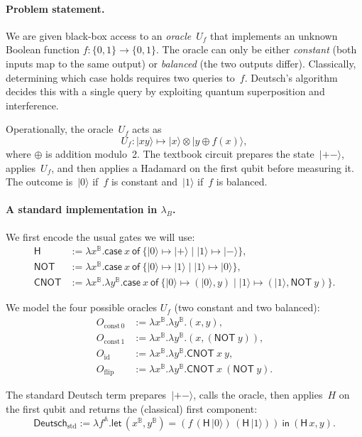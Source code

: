 \documentclass[runningheads,orivec,envcountsame,envcountsect]{llncs}
\newcommand\ket[1]{\ensuremath{|#1\rangle}}
\newcommand\AbsBasis{\ensuremath{\mathbb{A}}}
\def\Pair#1#2{(#1,#2)} %
\def\Lam#1#2#3{\lambda#1^{#2}{.}#3} %
\def\letkeyword{\mathsf{let}}
\def\inkeyword{\mathsf{in}}
\def\LetP#1#2#3#4#5#6{\letkeyword\,\Pair{#1^{#2}}{#3^{#4}}=#5~\inkeyword~#6}
\def\case#1#2#3#4#5{\ensuremath{\mathsf{case}~#1~\mathsf{of}~\{#2\mapsto #4 \mid #3\mapsto #5\}}}
\newcommand\B{\mathbb B}
\newcommand\Hd{\mathsf{H}}
\newcommand{\cnot}[2]{\mathsf{CNOT}\ #1\ #2}
\newcommand{\pauliX}[1]{\mathsf{NOT}\ #1}
\newcommand{\lambdaB}{\lambda_B}
\begin{document}
\paragraph{Problem statement.}
We are given black-box access to an \emph{oracle}~$U_f$ that implements an
unknown Boolean function $f:\{0,1\}\to\{0,1\}$.  
The oracle can only be either \emph{constant} (both inputs map to the same
output) or \emph{balanced} (the two outputs differ).  
Classically, determining which case holds requires two queries to~$f$.  
Deutsch's algorithm decides this with a single query by exploiting quantum
superposition and interference.

Operationally, the oracle~$U_f$ acts as
\[
  U_f:\ket{xy}\mapsto \ket{x}\otimes\ket{y\oplus f(x)},
\]
where $\oplus$ is addition modulo~2.  
The textbook circuit prepares the state~$\ket{+-}$, applies~$U_f$, and
then applies a Hadamard on the first qubit before measuring it.  
The outcome is~$\ket{0}$ if~$f$ is constant and~$\ket{1}$ if~$f$ is balanced.

\paragraph{A standard implementation in $\lambdaB$.}
We first encode the usual gates we will use:
\begin{align*}
  \Hd &:= \Lam{x}{\B}{\case{x}{\ket{0}}{\ket{1}}{\ket{+}}{\ket{-}}},\\
  \mathsf{NOT} &:= \Lam{x}{\B}{\case{x}{\ket{0}}{\ket{1}}{\ket{1}}{\ket{0}}},\\
  \mathsf{CNOT} &:= \Lam{x}{\B}{\Lam{y}{\B}{
    \case{x}{\ket{0}}{\ket{1}}
      {\Pair{\ket{0}}{y}}
      {\Pair{\ket{1}}{\pauliX{y}}}}}.
\end{align*}

We model the four possible oracles $U_f$ (two constant and two balanced):
\begin{align*}
  O_{\mathrm{const}\,0} &:= \Lam{x}{\B}{\Lam{y}{\B}{\Pair{x}{y}}},\\
  O_{\mathrm{const}\,1} &:= \Lam{x}{\B}{\Lam{y}{\B}{\Pair{x}{(\pauliX{y})}}},\\
  O_{\mathrm{id}}       &:= \Lam{x}{\B}{\Lam{y}{\B}{\cnot{x}{y}}},\\
  O_{\mathrm{flip}}     &:= \Lam{x}{\B}{\Lam{y}{\B}{\cnot{x}{(\pauliX{y})}}}.
\end{align*}

The standard Deutsch term prepares~$\ket{+-}$, calls the oracle, then
applies~$H$ on the first qubit and returns the (classical) first component:
\[
  \mathsf{Deutsch}_{\mathrm{std}} :=
  \Lam{f}{\AbsBasis}{
    \LetP{x}{\B}{y}{\B}
      {(f\,(\Hd\,\ket{0})\,(\Hd\,\ket{1}))}
      {\Pair{\Hd\,x}{y}}
  }.
\]
\end{document}
